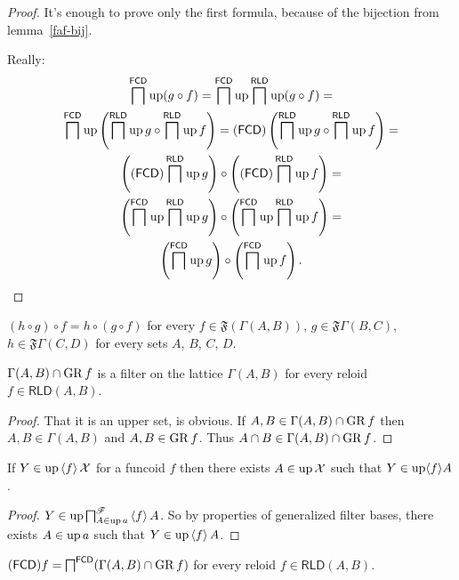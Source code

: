 \begin{proof}
It's enough to prove only the first formula, because of the bijection
from lemma~\ref{faf-bij}.

Really: 
\begin{multline*}
\bigsqcap^{\mathsf{FCD}}\operatorname{up}(g\circ f)=\bigsqcap^{\mathsf{FCD}}\operatorname{up}\bigsqcap^{\mathsf{RLD}}\operatorname{up}(g\circ f)=\\
\bigsqcap^{\mathsf{FCD}}\operatorname{up}\left(\bigsqcap^{\mathsf{RLD}}\operatorname{up} g\circ\bigsqcap^{\mathsf{RLD}}\operatorname{up} f\right)=(\mathsf{FCD})\left(\bigsqcap^{\mathsf{RLD}}\operatorname{up} g\circ\bigsqcap^{\mathsf{RLD}}\operatorname{up} f\right)=\\
\left((\mathsf{FCD})\bigsqcap^{\mathsf{RLD}}\operatorname{up} g\right)\circ\left((\mathsf{FCD})\bigsqcap^{\mathsf{RLD}}\operatorname{up} f\right)=\\
\left(\bigsqcap^{\mathsf{FCD}}\operatorname{up}\bigsqcap^{\mathsf{RLD}}\operatorname{up} g\right)\circ\left(\bigsqcap^{\mathsf{FCD}}\operatorname{up}\bigsqcap^{\mathsf{RLD}}\operatorname{up} f\right)=\\
\left(\bigsqcap^{\mathsf{FCD}}\operatorname{up} g\right)\circ\left(\bigsqcap^{\mathsf{FCD}}\operatorname{up} f\right).
\end{multline*}
\end{proof}
\begin{cor}
$(h\circ g)\circ f=h\circ(g\circ f)$ for every $f\in\mathfrak{F}(\Gamma(A,B))$,
$g\in\mathfrak{F}\Gamma(B,C)$, $h\in\mathfrak{F}\Gamma(C,D)$ for
every sets $A$, $B$, $C$, $D$.\end{cor}
\begin{lem}
$\Gamma(A,B)\cap\operatorname{GR} f$ is a filter on the lattice $\Gamma(A,B)$
for every reloid $f\in\mathsf{RLD}(A,B)$.\end{lem}
\begin{proof}
That it is an upper set, is obvious. If $A,B\in\Gamma(A,B)\cap\operatorname{GR} f$
then $A,B\in\Gamma(A,B)$ and $A,B\in\operatorname{GR} f$. Thus $A\cap B\in\Gamma(A,B)\cap\operatorname{GR} f$.\end{proof}
\begin{prop}
If $Y\in\operatorname{up}\left\langle f\right\rangle\mathcal{X}$ for a funcoid $f$ then there exists
$A\in\operatorname{up}\mathcal{X}$ such that $Y\in\operatorname{up}\langle f\rangle A$.\end{prop}
\begin{proof}
$Y\in\operatorname{up}\bigsqcap_{A\in\operatorname{up} a}^{\mathscr{F}}\left\langle f\right\rangle A$. So by properties
of generalized filter bases, there exists $A\in\operatorname{up} a$ such that $Y\in\operatorname{up}\left\langle f\right\rangle A$.\end{proof}
\begin{lem}
$(\mathsf{FCD}) f=\bigsqcap^{\mathsf{FCD}}(\Gamma(A,B)\cap\operatorname{GR} f)$ for every
reloid $f\in\mathsf{RLD}(A,B)$.\end{lem}
